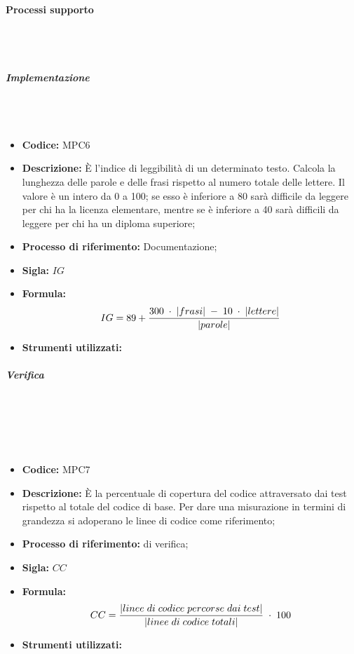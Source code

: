 \paragraph{Processi supporto}\mbox{}\\ \\
\subparagraph{Implementazione}\mbox{}\\ \\
\begin{itemize}
	\item \textbf{Codice:} MPC6
	\item \textbf{Descrizione:} È l'indice di leggibilità di un determinato testo. Calcola la lunghezza delle parole e delle frasi rispetto al numero totale delle lettere. Il valore è un intero da 0 a 100; se esso è inferiore a 80 sarà difficile da leggere per chi ha la licenza elementare, mentre se è inferiore a 40 sarà difficili da leggere per chi ha un diploma superiore;
	\item \textbf{Processo di riferimento:} Documentazione;
	\item \textbf{Sigla:} $IG$
	\item \textbf{Formula:} $$IG = 89 + {{300 \; \cdot \; |frasi| \; - \; 10 \; \cdot \; |lettere|}\over |parole|}$$
	\item \textbf{Strumenti utilizzati:}
\end{itemize}

\subparagraph{Verifica}\mbox{}\\ \\
\mbox{}\\ \\
\begin{itemize}
	\item \textbf{Codice:} MPC7
	\item \textbf{Descrizione:} È la percentuale di copertura del codice attraversato dai test rispetto al totale del codice di base. Per dare una misurazione in termini di grandezza si adoperano le linee di codice come riferimento;
	\item \textbf{Processo di riferimento:}  di verifica;
	\item \textbf{Sigla:} $CC$
	\item \textbf{Formula:} $$CC = {|linee \; di \; codice \; percorse \; dai  \; test| \over |linee \; di \; codice \; totali|} \; \cdot \; 100$$
	\item \textbf{Strumenti utilizzati:}
\end{itemize}

